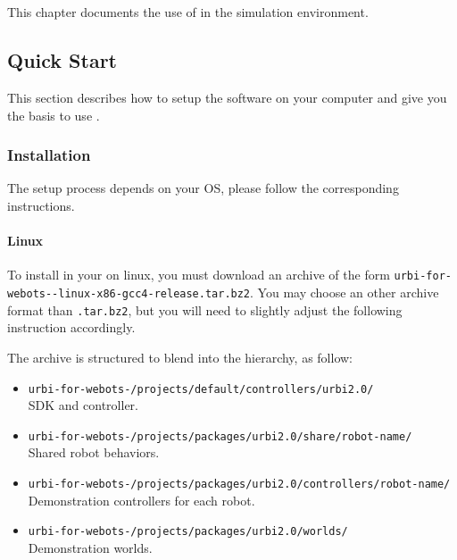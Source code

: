 \newenvironment{attribute}[4]
{
  \item \lstinline|#1|
    \begin{description}
    \item[Permissions] #2.
    \item[Type] #3.
      \ifx#4\empty\else
    \item[Range] #4.
      \fi
    \item[Description]
}{
    \end{description}
}

\chapter{\webots}
\label{sec:webots}

This chapter documents the use of \urbi in the \webots simulation
environment.

\section{Quick Start}

This section describes how to setup the software on your computer and
give you the basis to use \uwebots{}.

\subsection{Installation}

The setup process depends on your OS, please follow the corresponding
instructions.

\subsubsection{Linux}

To install \uwebots{} in your \webots{} on linux, you must download an
archive of the form
\texttt{urbi-for-webots--linux-x86-gcc4-release.tar.bz2}.
You may choose an other archive format than \texttt{.tar.bz2}, but you
will need to slightly adjust the following instruction accordingly.

The archive is structured to blend into the \webots hierarchy, as
follow:

\begin{itemize}
\item \texttt{urbi-for-webots-/projects/default/controllers/urbi2.0/}\\ \urbi{} SDK and
  \webots{} controller.
\item \texttt{urbi-for-webots-/projects/packages/urbi2.0/share/robot-name/}\\ Shared
  \us{} robot behaviors.
\item \texttt{urbi-for-webots-/projects/packages/urbi2.0/controllers/robot-name/}\\
  Demonstration controllers for each robot.
\item \texttt{urbi-for-webots-/projects/packages/urbi2.0/worlds/}\\ Demonstration
  worlds.
\end{itemize}

